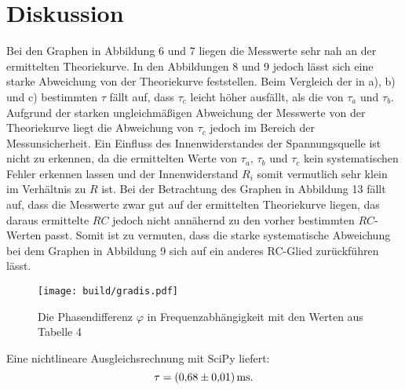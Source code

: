 \section{Diskussion}
\label{sec:Diskussion}\textbf{}
Bei den Graphen in Abbildung 6 und 7 liegen die Messwerte sehr nah an der ermittelten Theoriekurve. In den Abbildungen 8 und 9 jedoch lässt sich eine starke Abweichung von der Theoriekurve feststellen. Beim Vergleich der in a), b) und c) bestimmten $\tau$ fällt auf, dass $\tau_c$ leicht höher ausfällt, als die von $\tau_a$ und $\tau_b$. Aufgrund der starken ungleichmäßigen Abweichung der Messwerte von der Theoriekurve liegt die Abweichung von $\tau_c$ jedoch im Bereich der Messunsicherheit. Ein Einfluss des Innenwiderstandes der Spannungsquelle ist nicht zu erkennen, da die ermittelten Werte von $\tau_a$, $\tau_b$ und $\tau_c$ kein systematischen Fehler erkennen lassen und der Innenwiderstand $R_i$ somit vermutlich sehr klein im Verhältnis zu $R$ ist. Bei der Betrachtung des Graphen in Abbildung 13 fällt auf, dass die Messwerte zwar gut auf der ermittelten Theoriekurve liegen, das daraus ermittelte $RC$ jedoch nicht annähernd zu den vorher bestimmten $RC$-Werten passt. Somit ist zu vermuten, dass die starke systematische Abweichung bei dem Graphen in Abbildung 9 sich auf ein anderes RC-Glied zurückführen lässt. 

\begin{figure}[H]
	\centering
	\caption{Die Phasendifferenz $\varphi$ in Frequenzabhängigkeit mit den Werten aus Tabelle 4}
	\texttt{[image: build/gradis.pdf]}
	\label{fig:Dis}
\end{figure}
Eine nichtlineare Ausgleichsrechnung mit SciPy \cite{scipy} liefert:
\begin{displaymath}
\tau = \SI{0.68 \pm 0.01}{\milli\second}\text{.}
\end{displaymath}






	
